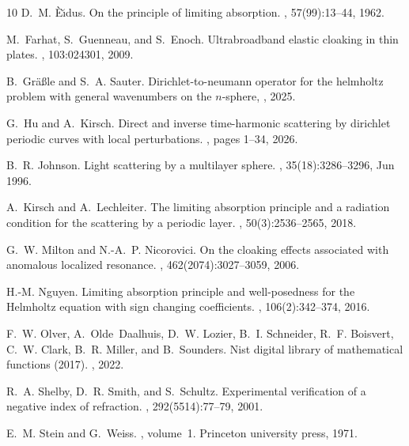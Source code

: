 \documentclass[12pt,reqno]{amsart}
\numberwithin{equation}{section}
\begin{document}
\begin{thebibliography}{10}
D.~M. \`E\u{\i}dus.
\newblock On the principle of limiting absorption.
, 57(99):13--44, 1962.

M.~Farhat, S.~Guenneau, and S.~Enoch.
\newblock Ultrabroadband elastic cloaking in thin plates.
, 103:024301, 2009.

B.~Gräßle and S.~A. Sauter.
\newblock Dirichlet-to-neumann operator for the helmholtz problem with general
  wavenumbers on the $n$-sphere, 
  , 2025.

G.~Hu and A.~Kirsch.
\newblock Direct and inverse time-harmonic scattering by dirichlet periodic
  curves with local perturbations.
, pages 1--34, 2026.

B.~R. Johnson.
\newblock Light scattering by a multilayer sphere.
, 35(18):3286--3296, Jun 1996.

A.~Kirsch and A.~Lechleiter.
\newblock The limiting absorption principle and a radiation condition for the
  scattering by a periodic layer.
, 50(3):2536--2565, 2018.

G.~W. Milton and N.-A.~P. Nicorovici.
\newblock On the cloaking effects associated with anomalous localized
  resonance.
,
  462(2074):3027--3059, 2006.

H.-M. Nguyen.
\newblock Limiting absorption principle and well-posedness for the {H}elmholtz
  equation with sign changing coefficients.
, 106(2):342--374, 2016.

F.~W. Olver, A.~Olde~Daalhuis, D.~W. Lozier, B.~I. Schneider, R.~F. Boisvert,
  C.~W. Clark, B.~R. Miller, and B.~Sounders.
\newblock Nist digital library of mathematical functions (2017).
, 2022.

R.~A. Shelby, D.~R. Smith, and S.~Schultz.
\newblock Experimental verification of a negative index of refraction.
, 292(5514):77--79, 2001.

E.~M. Stein and G.~Weiss.
, volume~1.
\newblock Princeton university press, 1971.


\end{thebibliography}
\end{document}
